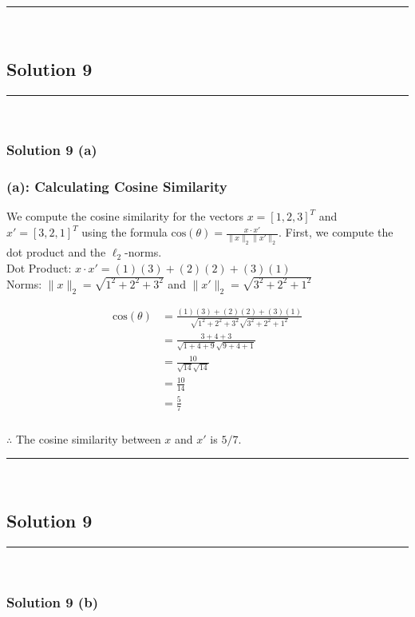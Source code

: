 \documentclass{article}
\begin{document}
\noindent\rule{\textwidth}{0.4pt}\\

\newpage

\subsection*{Solution 9}
\noindent\rule{\textwidth}{0.4pt}\\
\subsubsection*{Solution 9 (a)}

\subsubsection*{(a): Calculating Cosine Similarity}
\parbox{\textwidth}{
We compute the cosine similarity for the vectors $x = [1, 2, 3]^T$ and $x' = [3, 2, 1]^T$ using the formula $\text{cos}(\theta) = \frac{x \cdot x'}{\|x\|_2 \|x'\|_2}$. First, we compute the dot product and the $\ell_2$-norms.
\\
Dot Product: $x \cdot x' = (1)(3) + (2)(2) + (3)(1)$
\\
Norms: $\|x\|_2 = \sqrt{1^2 + 2^2 + 3^2}$ and $\|x'\|_2 = \sqrt{3^2 + 2^2 + 1^2}$
}
\begin{align*}
    \text{cos}(\theta) &= \frac{(1)(3) + (2)(2) + (3)(1)}{\sqrt{1^2+2^2+3^2} \sqrt{3^2+2^2+1^2}} \\
    &= \frac{3 + 4 + 3}{\sqrt{1+4+9} \sqrt{9+4+1}} \\
    &= \frac{10}{\sqrt{14} \sqrt{14}} \\
    &= \frac{10}{14} \\
    &= \frac{5}{7}
\end{align*}
\subsubsection*{\normalfont}{$\therefore$ The cosine similarity between $x$ and $x'$ is $5/7$.}


\noindent\rule{\textwidth}{0.4pt}\\

\newpage

\subsection*{Solution 9}
\noindent\rule{\textwidth}{0.4pt}\\
\subsubsection*{Solution 9 (b)}
\end{document}
